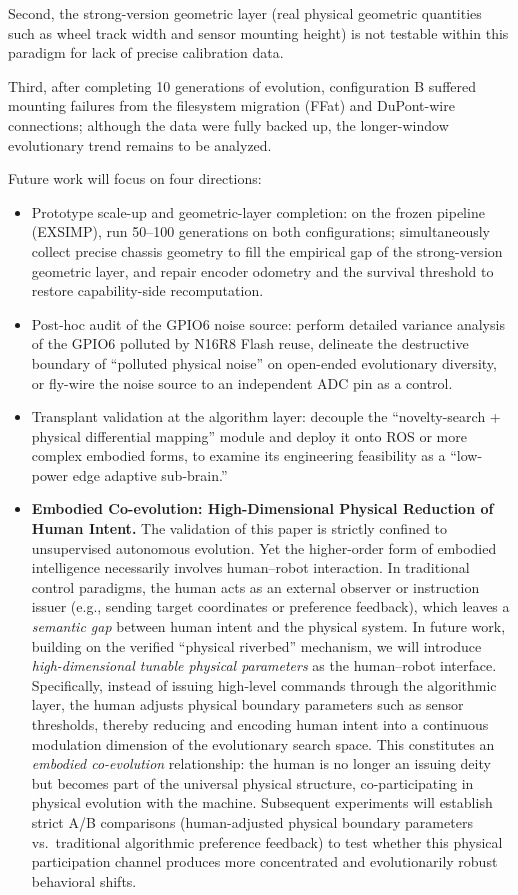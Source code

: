 \documentclass[11pt]{article}
\begin{document}
Second, the strong-version geometric layer (real physical geometric quantities such as wheel track width and sensor mounting height) is not testable within this paradigm for lack of precise calibration data.

Third, after completing 10 generations of evolution, configuration B suffered mounting failures from the filesystem migration (FFat) and DuPont-wire connections; although the data were fully backed up, the longer-window evolutionary trend remains to be analyzed.

Future work will focus on four directions:

\begin{itemize}
  \item[(1)] Prototype scale-up and geometric-layer completion: on the frozen pipeline (EXSIMP), run 50--100 generations on both configurations; simultaneously collect precise chassis geometry to fill the empirical gap of the strong-version geometric layer, and repair encoder odometry and the survival threshold to restore capability-side recomputation.
  \item[(2)] Post-hoc audit of the GPIO6 noise source: perform detailed variance analysis of the GPIO6 polluted by N16R8 Flash reuse, delineate the destructive boundary of ``polluted physical noise'' on open-ended evolutionary diversity, or fly-wire the noise source to an independent ADC pin as a control.
  \item[(3)] Transplant validation at the algorithm layer: decouple the ``novelty-search + physical differential mapping'' module and deploy it onto ROS or more complex embodied forms, to examine its engineering feasibility as a ``low-power edge adaptive sub-brain.''
  \item[(4)] \textbf{Embodied Co-evolution: High-Dimensional Physical Reduction of Human Intent.} The validation of this paper is strictly confined to unsupervised autonomous evolution. Yet the higher-order form of embodied intelligence necessarily involves human--robot interaction. In traditional control paradigms, the human acts as an external observer or instruction issuer (e.g., sending target coordinates or preference feedback), which leaves a \emph{semantic gap} between human intent and the physical system. In future work, building on the verified ``physical riverbed'' mechanism, we will introduce \emph{high-dimensional tunable physical parameters} as the human--robot interface. Specifically, instead of issuing high-level commands through the algorithmic layer, the human adjusts physical boundary parameters such as sensor thresholds, thereby reducing and encoding human intent into a continuous modulation dimension of the evolutionary search space. This constitutes an \emph{embodied co-evolution} relationship: the human is no longer an issuing deity but becomes part of the universal physical structure, co-participating in physical evolution with the machine. Subsequent experiments will establish strict A/B comparisons (human-adjusted physical boundary parameters vs.\ traditional algorithmic preference feedback) to test whether this physical participation channel produces more concentrated and evolutionarily robust behavioral shifts.
\end{itemize}
\end{document}

